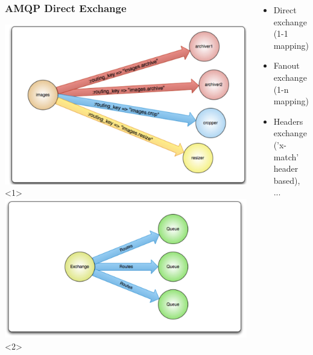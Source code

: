 \documentclass[12pt]{beamer}
\begin{document}
        \begin{frame}
            \begin{columns}
                    \begin{center}
                        \frametitle{AMQP Direct Exchange}
                        \includegraphics[width=1\textwidth]{images/direct-exchange}<1>
                        \includegraphics[width=1\textwidth]{images/fanout-exchange}<2>
                    \end{center}

                \begin{itemize}
                    \item Direct exchange (1-1 mapping)
                    \pause
                    \item Fanout exchange (1-n mapping)
                    \pause
                    \item Headers exchange ('x-match' header based), ...
                \end{itemize}
            \end{columns}
        \end{frame}
\end{document}
